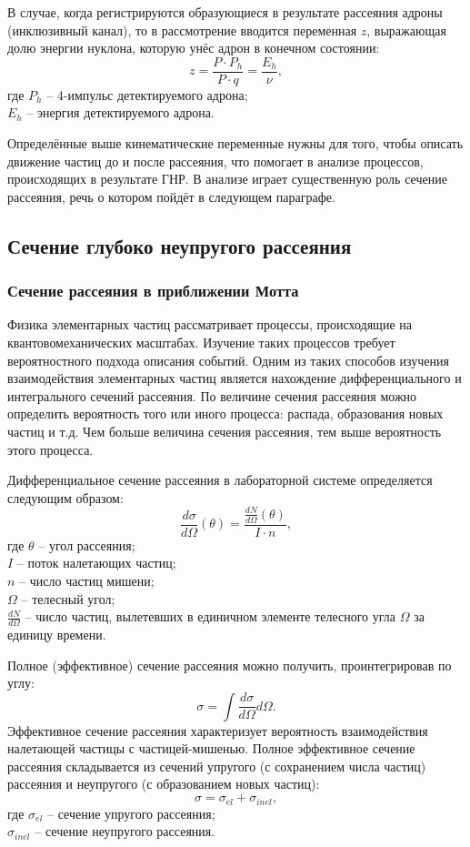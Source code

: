 \documentclass{extarticle}
\begin{document}
В случае, когда регистрируются образующиеся в результате рассеяния адроны (инклюзивный канал), то в рассмотрение вводится переменная $z$, выражающая долю энергии нуклона, которую унёс адрон в конечном состоянии:
\begin{equation}
	\label{eq:z}
	z = \frac{P \cdot P_h}{P \cdot q} = \frac{E_h}{\nu},
\end{equation}
где $P_h$ -- 4-импульс детектируемого адрона; \\ $E_h$ -- энергия детектируемого адрона. 

Определённые выше кинематические переменные нужны для того, чтобы описать движение частиц до и после рассеяния, что помогает в анализе процессов, происходящих в результате ГНР. В анализе играет существенную роль сечение рассеяния, речь о котором пойдёт в следующем параграфе.
\subsection{Сечение глубоко неупругого рассеяния}
\subsubsection{Сечение рассеяния в приближении Мотта}
Физика элементарных частиц рассматривает процессы, происходящие на квантовомеханических масштабах. Изучение таких процессов требует вероятностного подхода описания событий. Одним из таких способов изучения взаимодействия элементарных частиц является нахождение дифференциального и интегрального сечений рассеяния. По величине сечения рассеяния можно определить вероятность того или иного процесса: распада, образования новых частиц и т.д. Чем больше величина сечения рассеяния, тем выше вероятность этого процесса.

Дифференциальное сечение рассеяния в лабораторной системе определяется следующим образом:
\begin{equation}
    \frac{d\sigma}{d\Omega}(\theta) = \frac{\frac{dN}{d\Omega}(\theta)}{I \cdot n},
\end{equation}
где $\theta$ -- угол рассеяния; \\ $I$ -- поток налетающих частиц; \\ $n$ -- число частиц мишени; \\ $\Omega$ -- телесный угол; \\ $\frac{dN}{d\Omega}$ -- число частиц, вылетевших в единичном элементе телесного угла $\Omega$ за единицу времени.

Полное (эффективное) сечение рассеяния можно получить, проинтегрировав по углу:
\begin{equation}
    \sigma = \int \frac{d\sigma}{d\Omega}d\Omega. 
\end{equation}
Эффективное сечение рассеяния характеризует вероятность взаимодействия налетающей частицы с частицей-мишенью. Полное эффективное сечение рассеяния складывается из сечений упругого (с сохранением числа частиц) рассеяния и неупругого (с образованием новых частиц):
\begin{equation}
    \sigma = \sigma_{el} + \sigma_{inel},
\end{equation}
где $\sigma_{el}$ -- сечение упругого рассеяния; \\ $\sigma_{inel}$ -- сечение неупругого рассеяния. 
\end{document}
